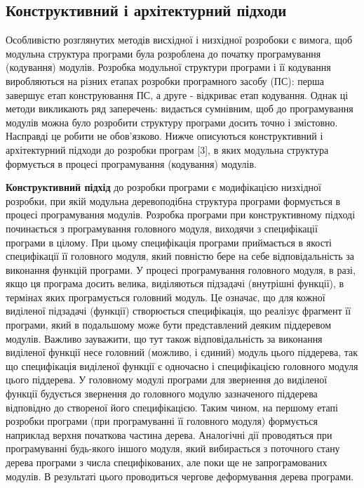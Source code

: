 \documentclass[a4paper,14pt, titlepage]{article}
\begin{document}
\subsection{Конструктивний і архітектурний підходи}

Особливістю розглянутих методів висхідної і низхідної розробоки є вимога,
щоб модульна структура програми була розроблена до початку програмування
(кодування) модулів. Розробка модульної структури програми і її
кодування виробляються на різних етапах розробки програмного засобу
(ПС): перша завершує етап конструювання ПС, а друге - відкриває етап
кодування. Однак ці методи викликають ряд заперечень: видається
сумнівним, щоб до програмування модулів можна було розробити структуру
програми досить точно і змістовно. Насправді це робити не обов'язково.
Нижче описуються конструктивний і архітектурний підходи до розробки
програм [3], в яких модульна структура формується в процесі
програмування (кодування) модулів.

\textbf{Конструктивний підхід} до розробки програми є модифікацією
низхідної розробки, при якій модульна деревоподібна структура програми
формується в процесі програмування модулів. Розробка програми при
конструктивному підході починається з програмування головного модуля,
виходячи з специфікації програми в цілому. При цьому специфікація
програми приймається в якості специфікації її головного модуля, який
повністю бере на себе відповідальність за виконання функцій програми. У
процесі програмування головного модуля, в разі, якщо ця програма досить
велика, виділяються підзадачі (внутрішні функції), в термінах яких
програмується головний модуль. Це означає, що для кожної виділеної
підзадачі (функції) створюється специфікація, що реалізує фрагмент її
програми, який в подальшому може бути представлений деяким піддеревом
модулів. Важливо зауважити, що тут також відповідальність за виконання
виділеної функції несе головний (можливо, і єдиний) модуль цього
піддерева, так що специфікація виділеної функції є одночасно і
специфікацією головного модуля цього піддерева. У головному модулі
програми для звернення до виділеної функції будується звернення до
головного модулю зазначеного піддерева відповідно до створеної його
специфікацією. Таким чином, на першому етапі розробки програми (при
програмуванні її головного модуля) формується наприклад верхня початкова частина
дерева. Аналогічні дії проводяться при програмуванні
будь-якого іншого модуля, який вибирається з поточного стану дерева
програми з числа специфікованих, але поки ще не запрограмованих модулів.
В результаті цього проводиться чергове деформування дерева програми.
\end{document}

